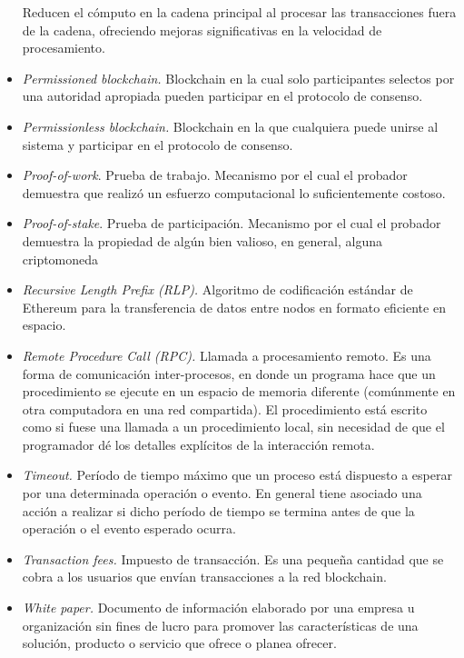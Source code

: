 \begin{itemize}
     Reducen el cómputo en la cadena principal al procesar las transacciones fuera de la cadena, ofreciendo mejoras
     significativas en la velocidad de procesamiento.
     \item \textit{Permissioned blockchain.} Blockchain en la cual solo participantes selectos por una autoridad
     apropiada pueden participar en el protocolo de consenso.
     \item \textit{Permissionless blockchain.} Blockchain en la que cualquiera puede unirse al sistema y participar
     en el protocolo de consenso.
     \item \textit{Proof-of-work}. Prueba de trabajo. Mecanismo por el cual el probador demuestra que
     realizó un esfuerzo computacional lo suficientemente costoso.
     \item \textit{Proof-of-stake}. Prueba de participación. Mecanismo por el cual el probador demuestra la propiedad de
     algún bien valioso, en general, alguna criptomoneda
     \item \textit{Recursive Length Prefix (RLP).} Algoritmo de codificación estándar de Ethereum para la transferencia de datos
     entre nodos en formato eficiente en espacio.
     \item \textit{Remote Procedure Call (RPC).} Llamada a procesamiento remoto. Es una forma de comunicación inter-procesos,
     en donde un programa hace que un procedimiento se ejecute en un espacio de memoria diferente (comúnmente en otra computadora
     en una red compartida). El procedimiento  está escrito como si fuese una llamada a un procedimiento local, sin necesidad de
     que el programador dé los detalles explícitos de la interacción remota.
     \item \textit{Timeout.} Período de tiempo máximo que un proceso está dispuesto a esperar por una determinada
     operación o evento. En general tiene asociado una acción a realizar si dicho período de tiempo se termina antes
     de que la operación o el evento esperado ocurra.
     \item \textit{Transaction fees.} Impuesto de transacción. Es una pequeña cantidad que se cobra a los
     usuarios que envían transacciones a la red blockchain.
     \item \textit{White paper.} Documento de información elaborado por una empresa u organización sin fines de lucro para promover
     las características de una solución, producto o servicio que ofrece o planea ofrecer.
\end{itemize}